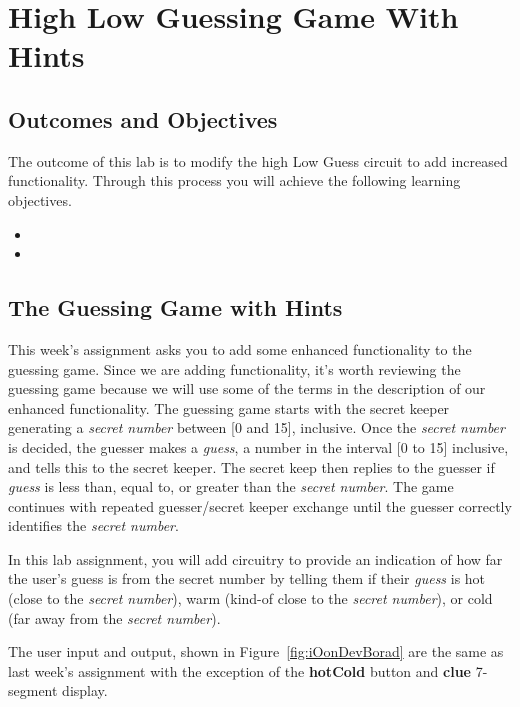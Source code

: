 \chapter{High Low Guessing Game With Hints}
\label{chapter:hlggwh}
\graphicspath{ {./Lab05HighLowWithHints/Fig} }



\section{Outcomes and Objectives}

The outcome of this lab is to modify the high Low Guess 
circuit to add increased functionality.
Through this process you will achieve the following
learning objectives.
\begin{itemize}
	\itemsep=0em
	\item {}
	\item {}
\end{itemize}


\section{The Guessing Game with Hints}

This week's assignment asks you to add some enhanced functionality to
the guessing game. Since we are adding functionality, it's worth reviewing the 
guessing game because we will use some of
the terms in the description of our enhanced functionality. The guessing game
starts with the secret keeper generating a \emph{secret number} between
{[}0 and 15{]}, inclusive. Once the \emph{secret number} is decided, the
guesser makes a \emph{guess}, a number in the interval {[}0 to 15{]}
inclusive, and tells this to the secret keeper. The secret keep then
replies to the guesser if \emph{guess} is less than, equal to, or
greater than the \emph{secret number}. The game continues with repeated
guesser/secret keeper exchange until the guesser correctly identifies
the \emph{secret number}.

In this lab assignment, you will add circuitry to provide an
indication of how far the user's guess is from the secret number by
telling them if their \emph{guess} is hot (close to the \emph{secret
number}), warm (kind-of close to the \emph{secret number}), or cold (far
away from the \emph{secret number}).

The user input and output, shown in Figure~\ref{fig:iOonDevBorad} are the same as last week's
assignment with the exception of the \textbf{hotCold} button and
\textbf{clue} 7-segment display.

